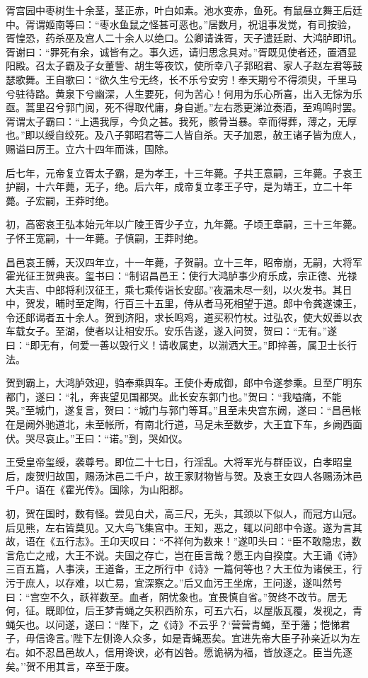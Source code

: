 \documentclass[]{article}
\begin{document}
胥宫园中枣树生十余茎，茎正赤，叶白如素。池水变赤，鱼死。有鼠昼立舞王后廷中。胥谓姬南等曰：``枣水鱼鼠之怪甚可恶也。''居数月，祝诅事发觉，有司按验，胥惶恐，药杀巫及宫人二十余人以绝口。公卿请诛胥，天子遣廷尉、大鸿胪即讯。胥谢曰：``罪死有余，诚皆有之。事久远，请归思念具对。''胥既见使者还，置酒显阳殿。召太子霸及子女董訾、胡生等夜饮，使所幸八子郭昭君、家人子赵左君等鼓瑟歌舞。王自歌曰：``欲久生兮无终，长不乐兮安穷！奉天期兮不得须臾，千里马兮驻待路。黄泉下兮幽深，人生要死，何为苦心！何用为乐心所喜，出入无悰为乐亟。蒿里召兮郭门阅，死不得取代庸，身自逝。''左右悉更涕泣奏酒，至鸡鸣时罢。胥谓太子霸曰：``上遇我厚，今负之甚。我死，骸骨当暴。幸而得葬，薄之，无厚也。''即以绶自绞死。及八子郭昭君等二人皆自杀。天子加恩，赦王诸子皆为庶人，赐谥曰厉王。立六十四年而诛，国除。

后七年，元帝复立胥太子霸，是为孝王，十三年薨。子共王意嗣，三年薨。子哀王护嗣，十六年薨，无子，绝。后六年，成帝复立孝王子守，是为靖王，立二十年薨。子宏嗣，王莽时绝。

初，高密哀王弘本始元年以广陵王胥少子立，九年薨。子顷王章嗣，三十三年薨。子怀王宽嗣，十一年薨。子慎嗣，王莽时绝。

昌邑哀王髆，天汉四年立，十一年薨，子贺嗣。立十三年，昭帝崩，无嗣，大将军霍光征王贺典丧。玺书曰：``制诏昌邑王：使行大鸿胪事少府乐成，宗正德、光禄大夫吉、中郎将利汉征王，乘七乘传诣长安邸。''夜漏未尽一刻，以火发书。其日中，贺发，晡时至定陶，行百三十五里，侍从者马死相望于道。郎中令龚遂谏王，令还郎谒者五十余人。贺到济阳，求长鸣鸡，道买积竹杖。过弘农，使大奴善以衣车载女子。至湖，使者以让相安乐。安乐告遂，遂入问贺，贺曰：``无有。''遂曰：``即无有，何爱一善以毁行义！请收属吏，以湔洒大王。''即捽善，属卫士长行法。

贺到霸上，大鸿胪效迎，驺奉乘舆车。王使仆寿成御，郎中令遂参乘。旦至广明东都门，遂曰：``礼，奔丧望见国都哭。此长安东郭门也。''贺曰：``我嗌痛，不能哭。''至城门，遂复言，贺曰：``城门与郭门等耳。''且至未央宫东阙，遂曰：``昌邑帐在是阙外驰道北，未至帐所，有南北行道，马足未至数步，大王宜下车，乡阙西面伏。哭尽哀止。''王曰：``诺。''到，哭如仪。

王受皇帝玺绶，袭尊号。即位二十七日，行淫乱。大将军光与群臣议，白孝昭皇后，废贺归故国，赐汤沐邑二千户，故王家财物皆与贺。及哀王女四人各赐汤沐邑千户。语在《霍光传》。国除，为山阳郡。

初，贺在国时，数有怪。尝见白犬，高三尺，无头，其颈以下似人，而冠方山冠。后见熊，左右皆莫见。又大鸟飞集宫中。王知，恶之，辄以问郎中令遂。遂为言其故，语在《五行志》。王卬天叹曰：``不祥何为数来！''遂叩头曰：``臣不敢隐忠，数言危亡之戒，大王不说。夫国之存亡，岂在臣言哉？愿王内自揆度。大王诵《诗》三百五篇，人事浃，王道备，王之所行中《诗》一篇何等也？大王位为诸侯王，行污于庶人，以存难，以亡易，宜深察之。''后又血污王坐席，王问遂，遂叫然号曰：``宫空不久，祅祥数至。血者，阴忧象也。宜畏慎自省。''贺终不改节。居无何，征。既即位，后王梦青蝇之矢积西阶东，可五六石，以屋版瓦覆，发视之，青蝇矢也。以问遂，遂曰：``陛下，之《诗》不云乎？`营营青蝇，至于藩；恺悌君子，毋信谗言。'陛下左侧谗人众多，如是青蝇恶矣。宜进先帝大臣子孙亲近以为左右。如不忍昌邑故人，信用谗谀，必有凶咎。愿诡祸为福，皆放逐之。臣当先逐矣。''贺不用其言，卒至于废。
\end{document}
